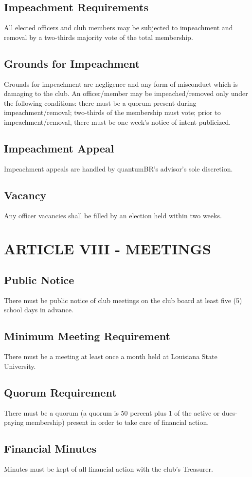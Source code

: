 \documentclass[11pt]{amsart}
\begin{document}
\subsection{Impeachment Requirements}
All elected officers and club members may be subjected to impeachment and removal by a two-thirds majority vote of the total membership.
\subsection{Grounds for Impeachment}
Grounds for impeachment are negligence and any form of misconduct which is damaging to the club.  An officer/member may be impeached/removed only under the following conditions: there must be a quorum present during impeachment/removal; two-thirds of the membership must vote; prior to impeachment/removal, there must be one week's notice of intent publicized.
\subsection{Impeachment Appeal}
Impeachment appeals are handled by quantumBR's advisor's sole discretion.
\subsection{Vacancy}
Any officer vacancies shall be filled by an election held within two weeks.


\section{ARTICLE VIII - MEETINGS}
\subsection{Public Notice}
There must be public notice of club meetings on the club board at least five (5) school days in advance.
\subsection{Minimum Meeting Requirement}
There must be a meeting at least once a month held at Louisiana State University.
\subsection{Quorum Requirement}
There must be a quorum (a quorum is 50 percent plus 1 of the active or dues-paying membership) present in order to take care of financial action.
\subsection{Financial Minutes}
Minutes must be kept of all financial action with the club’s Treasurer.
\end{document}
